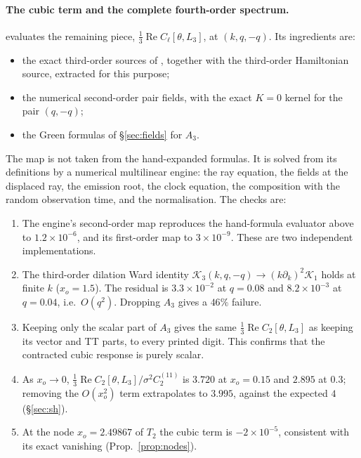 \paragraph{The cubic term and the complete fourth-order spectrum.}
 evaluates the remaining piece,
$\frac13\operatorname{Re}C_\ell[\theta,L_3]$, at $(k,q,-q)$. Its ingredients are:
\begin{itemize}
\item the exact third-order sources of , together with the
  third-order Hamiltonian source, extracted for this purpose;
\item the numerical second-order pair fields, with the exact $K=0$ kernel for the pair
  $(q,-q)$;
\item the Green formulas of \S\ref{sec:fields} for $A_3$.
\end{itemize}
The map is not taken from the hand-expanded formulas. It is solved from its definitions by a
numerical multilinear engine: the ray equation, the fields at the displaced ray, the
emission root, the clock equation, the composition with the random observation time, and
the normalisation. The checks are:
\begin{enumerate}
\item The engine's second-order map reproduces the hand-formula evaluator above to
  $1.2\times10^{-6}$, and its first-order map to $3\times10^{-9}$. These are two independent
  implementations.
\item The third-order dilation Ward identity
  $\mathcal K_3(k,q,-q)\to(k\partial_k)^2\mathcal K_1$ holds at finite $k$ ($x_o=1.5$). The
  residual is $3.3\times10^{-2}$ at $q=0.08$ and $8.2\times10^{-3}$ at $q=0.04$, i.e.\ $O(q^2)$.
  Dropping $A_3$ gives a $46\%$ failure.
\item Keeping only the scalar part of $A_3$ gives the same $\frac13\operatorname{Re}C_2[\theta,L_3]$
  as keeping its vector and TT parts, to every printed digit. This confirms that the
  contracted cubic response is purely scalar.
\item As $x_o\to0$, $\frac13\operatorname{Re}C_2[\theta,L_3]/\sigma^2C_2^{(11)}$ is $3.720$ at
  $x_o=0.15$ and $2.895$ at $0.3$; removing the $O(x_o^2)$ term extrapolates to $3.995$,
  against the expected $4$ (\S\ref{sec:sh}).
\item At the node $x_o=2.49867$ of $T_2$ the cubic term is $-2\times10^{-5}$, consistent with
  its exact vanishing (Prop.~\ref{prop:nodes}).
\end{enumerate}
